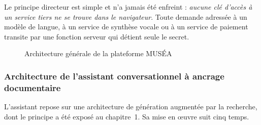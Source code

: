 Le principe directeur est simple et n'a jamais été enfreint : \emph{aucune clé
d'accès à un service tiers ne se trouve dans le navigateur}. Toute demande
adressée à un modèle de langue, à un service de synthèse vocale ou à un service
de paiement transite par une fonction serveur qui détient seule le secret.

\begin{figure}[htbp]
\centering
{}
\caption{Architecture générale de la plateforme MUSÉA}
\label{fig:archi}
\end{figure}

\subsubsection{Architecture de l'assistant conversationnel à ancrage documentaire}

L'assistant repose sur une architecture de génération augmentée par la
recherche, dont le principe a été exposé au chapitre~1. Sa mise en œuvre suit
cinq temps.

